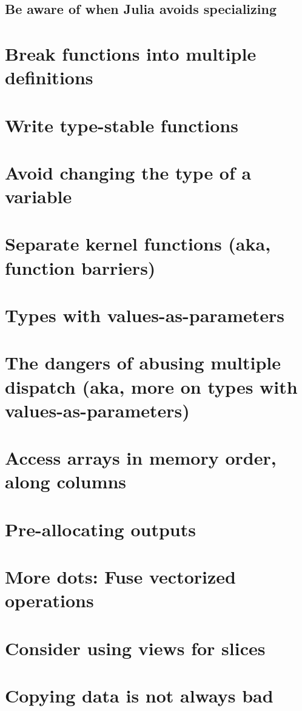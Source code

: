     \subsection{Be aware of when Julia avoids specializing}
    \section{Break functions into multiple definitions}
    \section{Write {\textquotedbl}type-stable{\textquotedbl} functions}
    \section{Avoid changing the type of a variable}
    \section{Separate kernel functions (aka, function barriers)}
    \section{Types with values-as-parameters}
    \section{The dangers of abusing multiple dispatch (aka, more on types with values-as-parameters)}
    \section{Access arrays in memory order, along columns}
    \section{Pre-allocating outputs}
    \section{More dots: Fuse vectorized operations}
    \section{Consider using views for slices}
    \section{Copying data is not always bad}
